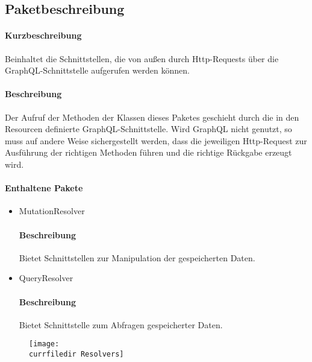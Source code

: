 \subsection*{Paketbeschreibung}%
\paragraph*{Kurzbeschreibung}
Beinhaltet die Schnittstellen, die von außen durch Http-Requests über die GraphQL-Schnittstelle aufgerufen werden können.
\paragraph*{Beschreibung}
Der Aufruf der Methoden der Klassen dieses Paketes geschieht durch die in den Resourcen definierte GraphQL-Schnittstelle.
Wird GraphQL nicht genutzt, so muss auf andere Weise sichergestellt werden, dass die jeweiligen Http-Request zur Ausführung der richtigen Methoden
führen und die richtige Rückgabe erzeugt wird.
\paragraph*{Enthaltene Pakete}
\begin{itemize}
    \item MutationResolver
    		\paragraph*{Beschreibung}
        Bietet Schnittstellen zur Manipulation der gespeicherten Daten.
    \item QueryResolver
    		\paragraph*{Beschreibung}
    		Bietet Schnittstelle zum Abfragen gespeicherter Daten.
\end{itemize}

\begin{figure}
  \centering
  \texttt{[image: \\currfiledir Resolvers]}
\end{figure}